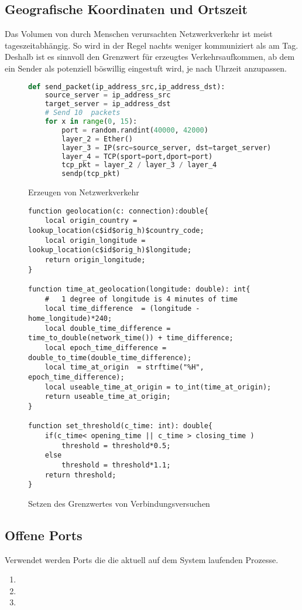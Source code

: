 \subsection{Geografische Koordinaten und Ortszeit}
Das Volumen von durch Menschen verursachten Netzwerkverkehr ist meist tageszeitabhängig. So wird in der Regel nachts weniger kommuniziert als am Tag.  Deshalb ist es sinnvoll den Grenzwert für erzeugtes Verkehrsaufkommen, ab dem ein Sender als potenziell böswillig eingestuft wird, je nach Uhrzeit anzupassen.\\
\begin{figure}[h!]
\centering
\begin{lstlisting}[language=python]
def send_packet(ip_address_src,ip_address_dst):
    source_server = ip_address_src
    target_server = ip_address_dst
	# Send 10  packets
    for x in range(0, 15):
        port = random.randint(40000, 42000)
        layer_2 = Ether()
        layer_3 = IP(src=source_server, dst=target_server)
        layer_4 = TCP(sport=port,dport=port)
        tcp_pkt = layer_2 / layer_3 / layer_4
        sendp(tcp_pkt)
\end{lstlisting}
\caption{Erzeugen von Netzwerkverkehr}
\end{figure}
\begin{figure}[h!]
\begin{lstlisting}
function geolocation(c: connection):double{
	local origin_country = lookup_location(c$id$orig_h)$country_code;
	local origin_longitude = lookup_location(c$id$orig_h)$longitude;
	return origin_longitude;
}

function time_at_geolocation(longitude: double): int{
	#	1 degree of longitude is 4 minutes of time
	local time_difference  = (longitude - home_longitude)*240;
	local double_time_difference = time_to_double(network_time()) + time_difference;
	local epoch_time_difference = double_to_time(double_time_difference);
	local time_at_origin  = strftime("%H", epoch_time_difference);
	local useable_time_at_origin = to_int(time_at_origin);
	return useable_time_at_origin;
}

function set_threshold(c_time: int): double{
	if(c_time< opening_time || c_time > closing_time )
		threshold = threshold*0.5;
	else 
		threshold = threshold*1.1;
	return threshold;
}
\end{lstlisting}
\caption{Setzen des Grenzwertes von Verbindungsversuchen}
\end{figure}
\pagebreak
\subsection{Offene Ports}
Verwendet werden Ports die die aktuell auf dem System laufenden Prozesse.
\begin{enumerate}
\item{}
\item{}
\item{}
\end{enumerate}

